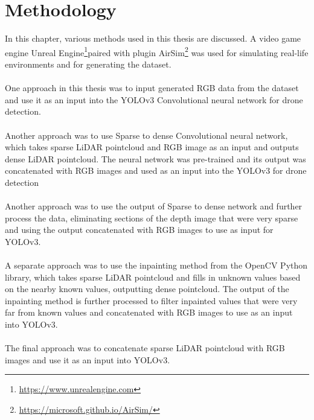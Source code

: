 \documentclass[twoside]{ctuthesis}
\theoremstyle{plain}
\theoremstyle{definition}
\theoremstyle{note}
\begin{document}
\chapter{Methodology}
In this chapter, various methods used in this thesis are discussed. A video game engine Unreal Engine\footnote{\url{https://www.unrealengine.com}}paired with plugin AirSim\footnote{\url{https://microsoft.github.io/AirSim/}} was used for simulating real-life environments and for generating the dataset.\\
\\
One approach in this thesis was to input generated RGB data from the dataset and use it as an input into the YOLOv3 Convolutional neural network for drone detection.\\
\\
Another approach was to use Sparse to dense Convolutional neural network, which takes sparse LiDAR pointcloud and RGB image as an input and outputs dense LiDAR pointcloud. The neural network was pre-trained and its output was concatenated with RGB images and used as an input into the YOLOv3  for drone detection\\
\\
Another approach was to use the output of Sparse to dense network and further process the data, eliminating sections of the depth image that were very sparse and using the output concatenated with RGB images to use as input for YOLOv3.\\
\\
A separate approach was to use the inpainting method from the OpenCV Python library, which takes sparse LiDAR pointcloud and fills in unknown values based on the nearby known values, outputting dense pointcloud. The output of the inpainting method is further processed to filter inpainted values that were very far from known values and concatenated with RGB images to use as an input into YOLOv3.\\
\\
The final approach was to concatenate sparse LiDAR pointcloud with RGB images and use it as an input into YOLOv3.
\end{document}
